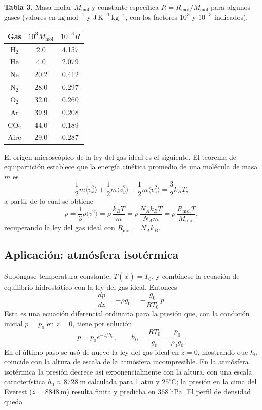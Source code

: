 \begin{center}
\textbf{Tabla 3.} Masa molar $M_{\mathrm{mol}}$ y constante específica $R = R_{\mathrm{mol}}/M_{\mathrm{mol}}$ para algunos gases (valores en $\mathrm{kg\,mol^{-1}}$ y $\mathrm{J\,K^{-1}\,kg^{-1}}$, con los factores $10^{3}$ y $10^{-3}$ indicados).
\begin{tabular}{ccc}
\hline
Gas & $10^{3}M_{\mathrm{mol}}$ & $10^{-3}R$ \\
\hline
H$_2$ & 2.0 & 4.157 \\
He & 4.0 & 2.079 \\
Ne & 20.2 & 0.412 \\
N$_2$ & 28.0 & 0.297 \\
O$_2$ & 32.0 & 0.260 \\
Ar & 39.9 & 0.208 \\
CO$_2$ & 44.0 & 0.189 \\
Aire & 29.0 & 0.287 \\
\hline
\end{tabular}
\end{center}

El origen microscópico de la ley del gas ideal es el siguiente. El teorema de equipartición establece que la energía cinética promedio de una molécula de masa $m$ es
$$ \frac{1}{2}m\langle v_x^2\rangle + \frac{1}{2}m\langle v_y^2\rangle + \frac{1}{2}m\langle v_z^2\rangle = \frac{3}{2}k_B T, $$
a partir de lo cual se obtiene
$$ p = \frac{1}{3}\rho\langle v^2\rangle = \rho\,\frac{k_B T}{m} = \rho\,\frac{N_A k_B T}{N_A m} = \rho\,\frac{R_{\mathrm{mol}}T}{M_{\mathrm{mol}}}, $$
recuperando la ley del gas ideal con $R_{\mathrm{mol}} = N_A k_B$.

\figuraGasIdealMicroscopico

\subsection{Aplicación: atmósfera isotérmica}

Supóngase temperatura constante, $T(\vec{x}) = T_0$, y combínese la ecuación de equilibrio hidrostático con la ley del gas ideal. Entonces
$$ \frac{dp}{dz} = -\rho g_0 = -\frac{g_0}{RT_0}\,p. $$
Esta es una ecuación diferencial ordinaria para la presión que, con la condición inicial $p = p_0$ en $z = 0$, tiene por solución
$$ p = p_0 e^{-z/h_0}, \qquad h_0 = \frac{RT_0}{g_0} = \frac{p_0}{\rho_0 g_0}. $$
En el último paso se usó de nuevo la ley del gas ideal en $z=0$, mostrando que $h_0$ coincide con la altura de escala de la atmósfera incompresible. En la atmósfera isotérmica la presión decrece así exponencialmente con la altura, con una escala característica $h_0 \approx 8728\ \mathrm{m}$ calculada para 1 atm y $25^\circ\mathrm{C}$; la presión en la cima del Everest ($z = 8848\ \mathrm{m}$) resulta finita y predicha en $368\ \mathrm{hPa}$. El perfil de densidad queda

